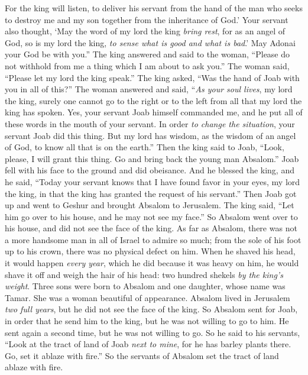 \begin{biblechapter}
\verse For the king will listen, to deliver his servant from the hand of the man who seeks to destroy me and my son together from the inheritance of God.’
\verse Your servant also thought, ‘May the word of my lord the king \textit{bring rest}, for as an angel of God, so is my lord the king, \textit{to sense what is good and what is bad}.’ May Adonai your God be with you.”
\verse The king answered and said to the woman, “Please do not withhold from me a thing which I am about to ask you.” The woman said, “Please let my lord the king speak.”
\verse The king asked, “Was the hand of Joab with you in all of this?” The woman answered and said, “\textit{As your soul lives}, my lord the king, surely one cannot go to the right or to the left from all that my lord the king has spoken. Yes, your servant Joab himself commanded me, and he put all of these words in the mouth of your servant.
\verse In order \textit{to change the situation}, your servant Joab did this thing. But my lord has wisdom, as the wisdom of an angel of God, to know all that is on the earth.”
\verse Then the king said to Joab, “Look, please, I will grant this thing. Go and bring back the young man Absalom.”
\verse Joab fell with his face to the ground and did obeisance. And he blessed the king, and he said, “Today your servant knows that I have found favor in your eyes, my lord the king, in that the king has granted the request of his servant.”
 Then Joab got up and went to Geshur and brought Absalom to Jerusalem.
\verse The king said, “Let him go over to his house, and he may not see my face.” So Absalom went over to his house, and did not see the face of the king.
\verse As far as Absalom, there was not a more handsome man in all of Israel to admire so much; from the sole of his foot up to his crown, there was no physical defect on him.
\verse When he shaved his head, it would happen \textit{every year}, which he did because it was heavy on him, he would shave it off and weigh the hair of his head: two hundred shekels \textit{by the king’s weight}.
\verse Three sons were born to Absalom and one daughter, whose name was Tamar. She was a woman beautiful of appearance.
\verse Absalom lived in Jerusalem \textit{two full years}, but he did not see the face of the king.
\verse So Absalom sent for Joab, in order that he send him to the king, but he was not willing to go to him. He sent again a second time, but he was not willing to go.
\verse So he said to his servants, “Look at the tract of land of Joab \textit{next to mine}, for he has barley plants there. Go, set it ablaze with fire.” So the servants of Absalom set the tract of land ablaze with fire.

\end{biblechapter}
